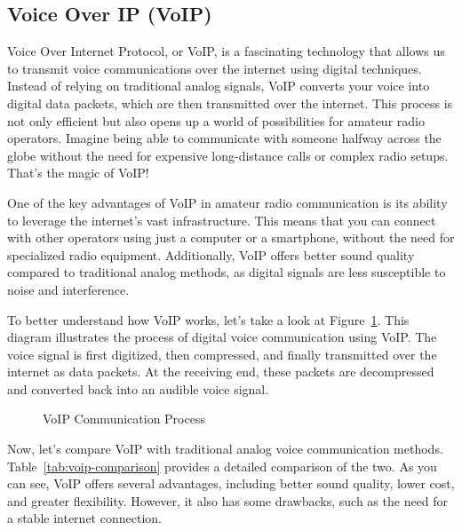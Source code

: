 \subsection{Voice Over IP (VoIP)}
\label{subsec:voip}

Voice Over Internet Protocol, or VoIP, is a fascinating technology that allows us to transmit voice communications over the internet using digital techniques. Instead of relying on traditional analog signals, VoIP converts your voice into digital data packets, which are then transmitted over the internet. This process is not only efficient but also opens up a world of possibilities for amateur radio operators. Imagine being able to communicate with someone halfway across the globe without the need for expensive long-distance calls or complex radio setups. That's the magic of VoIP!

One of the key advantages of VoIP in amateur radio communication is its ability to leverage the internet's vast infrastructure. This means that you can connect with other operators using just a computer or a smartphone, without the need for specialized radio equipment. Additionally, VoIP offers better sound quality compared to traditional analog methods, as digital signals are less susceptible to noise and interference. 

To better understand how VoIP works, let's take a look at Figure~\ref{fig:voip-process}. This diagram illustrates the process of digital voice communication using VoIP. The voice signal is first digitized, then compressed, and finally transmitted over the internet as data packets. At the receiving end, these packets are decompressed and converted back into an audible voice signal.

\begin{figure}[h]
    \centering
    \caption{VoIP Communication Process}
    \label{fig:voip-process}
\end{figure}

Now, let's compare VoIP with traditional analog voice communication methods. Table~\ref{tab:voip-comparison} provides a detailed comparison of the two. As you can see, VoIP offers several advantages, including better sound quality, lower cost, and greater flexibility. However, it also has some drawbacks, such as the need for a stable internet connection.

